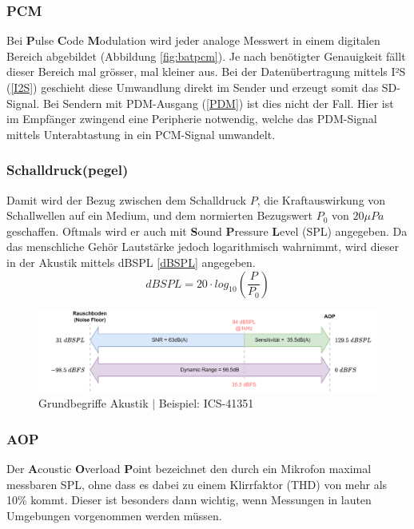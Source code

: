 \documentclass[12pt]{article}
\begin{document}
	\subsubsection*{PCM}
	Bei \textbf{P}ulse \textbf{C}ode \textbf{M}odulation wird jeder analoge Messwert in einem digitalen Bereich abgebildet (Abbildung \ref{fig:batpcm}). Je nach benötigter Genauigkeit fällt dieser Bereich mal grösser, mal kleiner aus. Bei der Datenübertragung mittels I²S (\ref{I2S}) geschieht diese Umwandlung direkt im Sender und erzeugt somit das SD-Signal. Bei Sendern mit PDM-Ausgang (\ref{PDM}) ist dies nicht der Fall. Hier ist im Empfänger zwingend eine Peripherie notwendig, welche das PDM-Signal mittels Unterabtastung in ein PCM-Signal umwandelt.
	\subsubsection*{Schalldruck(pegel)}
	Damit wird der Bezug zwischen dem Schalldruck \textbf{$P$}, die Kraftauswirkung von Schallwellen auf ein Medium, und dem normierten Bezugswert \textbf{$P_0$} von $20 \mu Pa$ geschaffen. Oftmals wird er auch mit \textbf{S}ound \textbf{P}ressure \textbf{L}evel (SPL) angegeben. Da das menschliche Gehör Lautstärke jedoch logarithmisch wahrnimmt, wird dieser in der Akustik mittels dBSPL \ref{dBSPL} angegeben.
	\begin{equation}\label{dBSPL}
		dBSPL = 20 \cdot log_{10}(\frac{P}{P_0})
	\end{equation}
	\begin{figure}[H]
		\centering
		\includegraphics[width=\linewidth]{images/BAT_PDM_Grundbegriffe}
		\caption{Grundbegriffe Akustik $\vert$ Beispiel: ICS-41351}
		\label{fig:batpdmgrundbegriffe}
	\end{figure}
	\subsubsection*{AOP} \label{AOP}
	Der \textbf{A}coustic \textbf{O}verload \textbf{P}oint bezeichnet den durch ein Mikrofon maximal messbaren SPL, ohne dass es dabei zu einem Klirrfaktor (THD) von mehr als 10\% kommt. Dieser ist besonders dann wichtig, wenn Messungen in lauten Umgebungen vorgenommen werden müssen.
\end{document}
